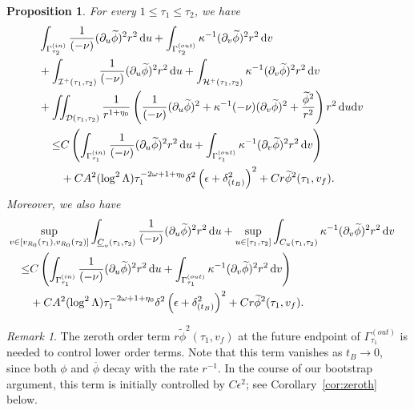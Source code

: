 \documentclass[10pt, reqno]{amsart}
\newtheorem{proposition}[theorem]{Proposition}
\theoremstyle{definition}
\theoremstyle{remark}
\newtheorem{remark}[theorem]{Remark}
\theoremstyle{conjecture}
\numberwithin{equation}{section}
\newcommand{\ud}{\mathrm{d}}
\newcommand{\rd}{\partial}
\newcommand{\0}{\emptyset}
\newcommand{\Gmm}{\Gamma}
\newcommand{\dlt}{\delta}
\newcommand{\eps}{\epsilon}
\newcommand{\kpp}{\kappa}
\newcommand{\Lmb}{\Lambda}
\newcommand{\omg}{\omega}
\newcommand{\calD}{\mathcal D}
\newcommand{\calH}{\mathcal H}
\newcommand{\calI}{\mathcal I}
\newcommand{\uC}{\underline{C}}
\newcommand{\dur}{\nu}
\newcommand{\EH}{\calH^{+}}
\newcommand{\NI}{\calI^{+}}						%
\newcommand{\phibg}{\overline{\phi}}				%
\newcommand{\phidf}{\widetilde{\phi}}				%
\begin{document}
\begin{proposition} \label{prop:energy-goal}
For every $1 \leq \tau_{1} \leq \tau_{2}$, we have
\begin{equation} \label{eq:en-goal}
\begin{aligned}
& \hskip-2em
	\int_{\Gmm^{(in)}_{\tau_{2}}} \frac{1}{(-\dur)} (\rd_{u} \phidf)^{2} r^{2} \, \ud u
	+ \int_{\Gmm^{(out)}_{\tau_{2}}} \kpp^{-1} (\rd_{v} \phidf)^{2} r^{2} \, \ud v  \\
& \hskip-2em
	+ \int_{\NI(\tau_{1}, \tau_{2})} \frac{1}{(-\dur)} (\rd_{u} \phidf)^{2} r^{2} \, \ud u
	+ \int_{\EH(\tau_{1}, \tau_{2})} \kpp^{-1} (\rd_{v} \phidf)^{2} r^{2} \, \ud v  \\
& \hskip-2em
	+ \iint_{\calD(\tau_{1}, \tau_{2})} \frac{1}{r^{1+\eta_{0}}} \left( \frac{1}{(-\dur)} (\rd_{u} \phidf)^{2} + \kpp^{-1} (-\dur) (\rd_{v} \phidf)^{2} + \frac{\phidf^{2}}{r^{2}} \right) r^{2} \, \ud u \ud v \\
	\leq & C \left( \int_{\Gmm^{(in)}_{\tau_{1}}} \frac{1}{(-\dur)} (\rd_{u} \phidf)^{2} r^{2} \, \ud u
	+ \int_{\Gmm^{(out)}_{\tau_{1}}} \kpp^{-1} (\rd_{v} \phidf)^{2} r^{2} \, \ud v \right) \\
	& + C A^{2} (\log^{2} \Lmb) \tau_{1}^{-2\omg+1+\eta_{0}} \dlt^{2} \left( \eps + \dlt_{(t_{B})}^{2} \right)^{2}
	+ C r \phidf^{2} (\tau_{1}, v_{f}) .
\end{aligned}
\end{equation}
Moreover, we also have
\begin{equation} \label{eq:en-null-goal}
\begin{aligned}
& \hskip-2em
	\sup_{v \in [v_{R_{0}}(\tau_{1}), v_{R_0}(\tau_{2})] }\int_{\uC_{v}(\tau_{1}, \tau_{2})} \frac{1}{(-\dur)} (\rd_{u} \phidf)^{2} r^{2} \, \ud u
	+ \sup_{u \in [\tau_{1}, \tau_{2}] }\int_{C_{u}(\tau_{1}, \tau_{2})} \kpp^{-1} (\rd_{v} \phidf)^{2} r^{2} \, \ud v  \\
	\leq & C \left( \int_{\Gmm^{(in)}_{\tau_{1}}} \frac{1}{(-\dur)} (\rd_{u} \phidf)^{2} r^{2} \, \ud u
	+ \int_{\Gmm^{(out)}_{\tau_{1}}} \kpp^{-1} (\rd_{v} \phidf)^{2} r^{2} \, \ud v \right) \\
	& + C A^{2} (\log^{2} \Lmb) \tau_{1}^{-2\omg+1+\eta_{0}} \dlt^{2} \left( \eps + \dlt_{(t_{B})}^{2} \right)^{2}
	+ C r \phidf^{2} (\tau_{1}, v_{f}) .
\end{aligned}
\end{equation}
\end{proposition}
\begin{remark}  \label{rem:zeroth}
The zeroth order term $r \phidf^{2} (\tau_{1}, v_{f})$ at the future endpoint of $\Gmm_{\tau_{1}}^{(out)}$ is needed to control lower order terms. Note that this term vanishes as $t_{B} \to 0$, since both $\phi$ and $\phibg$ decay with the rate $r^{-1}$. In the course of our bootstrap argument, this term is initially controlled by $C \eps^{2}$; see Corollary~\ref{cor:zeroth} below.
\end{remark}
\end{document}
